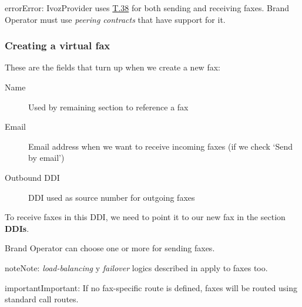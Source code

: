 \documentclass[letterpaper,10pt,english]{sphinxmanual}
\begin{document}
\begin{notice}{error}{Error:}
IvozProvider uses
\href{http://www.voip-info.org/wiki/view/T.38}{T.38} for both sending and receiving
faxes. Brand Operator must use \emph{peering contracts} that have support for it.
\end{notice}


\subsubsection{Creating a virtual fax}
\label{administration_portal/client/residential/faxes:creating-a-virtual-fax}
These are the fields that turn up when we create a new fax:
\begin{description}
\item[{Name}] \leavevmode{}\label{administration_portal/client/residential/faxes:term-name}
Used by remaining section to reference a fax

\item[{Email}] \leavevmode{}\label{administration_portal/client/residential/faxes:term-email}
Email address when we want to receive incoming faxes (if we check `Send
by email')

\item[{Outbound DDI}] \leavevmode{}\label{administration_portal/client/residential/faxes:term-outbound-ddi}
DDI used as source number for outgoing faxes

\end{description}

To receive faxes in this DDI, we need to point it to our new fax in the section
\textbf{DDIs}.

Brand Operator can choose one or more {\hyperref[administration_portal/brand/routing/outgoing_routings:outgoing\string-routings]{}} for sending faxes.

\begin{notice}{note}{Note:}
\emph{load-balancing} y \emph{failover} logics described in {\hyperref[administration_portal/brand/routing/outgoing_routings:outgoing\string-routings]{}}
apply to faxes too.
\end{notice}

\begin{notice}{important}{Important:}
If no fax-specific route is defined, faxes will be routed using
standard call routes.
\end{notice}
\end{document}
